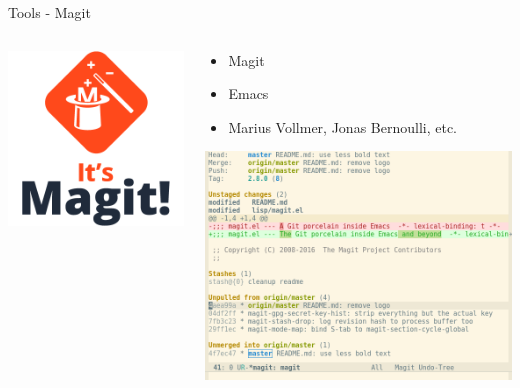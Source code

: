 \documentclass[table,svgnames,aspectratio=169]{beamer}
\begin{document}
\begin{frame}[label={sec:org8146568}]{Tools - Magit}
\begin{columns}
\begin{column}{.5\columnwidth}
\begin{center}
\includegraphics[width=.9\linewidth]{graphics/magit.png}
\end{center}
\end{column}

\begin{column}{.5\columnwidth}
\begin{itemize}
\item Magit
\item Emacs
\item Marius Vollmer, Jonas Bernoulli, etc.
\end{itemize}

\begin{center}
\includegraphics[width=.9\linewidth]{graphics/magit_status.png}
\end{center}
\end{column}
\end{columns}
\end{frame}
\end{document}
